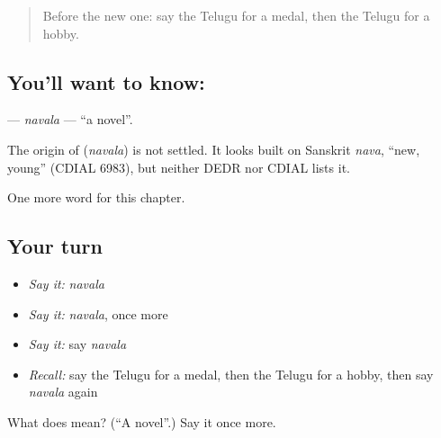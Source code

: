 \label{lesson:TE-C189-navala}



\begin{quote}
Before the new one: say the Telugu for a medal, then the Telugu for a hobby.
\end{quote}

\subsection*{You'll want to know: }
\textbf{} — \emph{navala} — \textquotedblleft{}a novel\textquotedblright{}.

\begin{cousinweb}
The origin of \textbf{} (\emph{navala}) is not settled. It looks built on Sanskrit \emph{nava}, \textquotedblleft{}new, young\textquotedblright{} (CDIAL 6983), but neither DEDR nor CDIAL lists it.
\end{cousinweb}

\begin{grammarlens}[title={What you've built}]
One more word for this chapter.
\end{grammarlens}

\subsection*{Your turn}
\begin{itemize}
\raggedright
  \item \emph{Say it:} \emph{navala}
  \item \emph{Say it:} \emph{navala}, once more
  \item \emph{Say it:} say \emph{navala}
  \item \emph{Recall:} say the Telugu for a medal, then the Telugu for a hobby, then say \emph{navala} again
\end{itemize}

\begin{tcolorbox}[breakable,colback=teal!4,colframe=teal!35!black,title={Before you move on}]
What does  mean? (\textquotedblleft{}A novel\textquotedblright{}.) Say it once more.
\end{tcolorbox}

